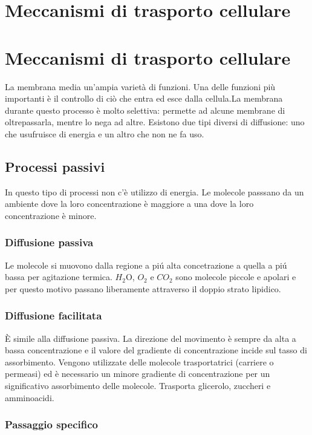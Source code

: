 \chapter{Meccanismi di trasporto cellulare}
\chapter{Meccanismi di trasporto cellulare}
La membrana media un'ampia varietà di funzioni. Una delle funzioni pi\`u importanti \`e il controllo di ci\`o  che entra ed esce dalla cellula.La membrana durante questo processo è molto selettiva: permette ad alcune membrane di oltrepassarla, mentre lo nega ad altre. Esistono due tipi diversi di diffusione: uno che usufruisce di energia e un altro che non ne fa uso.
\section{Processi passivi}
In questo tipo di processi non c'\`e utilizzo di energia. Le molecole passsano da un ambiente dove la loro concentrazione \`e maggiore a una dove la loro concentrazione \`e minore.
\subsection{Diffusione passiva}
Le molecole si muovono dalla regione a pi\'u alta concetrazione a quella a pi\'u bassa per agitazione termica. $H_2$O, $O_2$ e $CO_2$ sono molecole piccole e apolari e per questo motivo passano liberamente attraverso il doppio strato lipidico. 
\subsection{Diffusione facilitata}
\`E simile alla diffusione passiva. La direzione del movimento \`e sempre da alta a bassa concentrazione e il valore del gradiente di concentrazione incide sul tasso di assorbimento. Vengono utilizzate delle molecole trasportatrici (carriere o permeasi) ed \`e necessario un minore gradiente di concentrazione per un significativo assorbimento delle molecole. Trasporta glicerolo, zuccheri e amminoacidi.
\subsection{Passaggio specifico}
